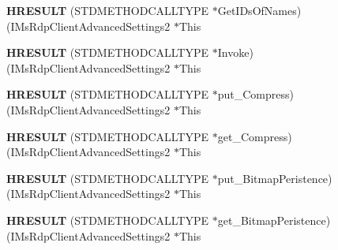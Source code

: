 \begin{DoxyCompactItemize}
\item 
\mbox{\label{struct_i_ms_rdp_client_advanced_settings2_vtbl_a07695658fcaeb0ec746813787e006a06}} 
{\bfseries H\+R\+E\+S\+U\+LT} (S\+T\+D\+M\+E\+T\+H\+O\+D\+C\+A\+L\+L\+T\+Y\+PE $\ast$Get\+I\+Ds\+Of\+Names)(I\+Ms\+Rdp\+Client\+Advanced\+Settings2 $\ast$This
\item 
\mbox{\label{struct_i_ms_rdp_client_advanced_settings2_vtbl_a28e6e8a8f912e6b46de41c37d44b7241}} 
{\bfseries H\+R\+E\+S\+U\+LT} (S\+T\+D\+M\+E\+T\+H\+O\+D\+C\+A\+L\+L\+T\+Y\+PE $\ast$Invoke)(I\+Ms\+Rdp\+Client\+Advanced\+Settings2 $\ast$This
\item 
\mbox{\label{struct_i_ms_rdp_client_advanced_settings2_vtbl_a63859ea0bf25d69e9b0d61fb230e764a}} 
{\bfseries H\+R\+E\+S\+U\+LT} (S\+T\+D\+M\+E\+T\+H\+O\+D\+C\+A\+L\+L\+T\+Y\+PE $\ast$put\+\_\+\+Compress)(I\+Ms\+Rdp\+Client\+Advanced\+Settings2 $\ast$This
\item 
\mbox{\label{struct_i_ms_rdp_client_advanced_settings2_vtbl_afabbe992ba1fda30c591bfeeb9b3c536}} 
{\bfseries H\+R\+E\+S\+U\+LT} (S\+T\+D\+M\+E\+T\+H\+O\+D\+C\+A\+L\+L\+T\+Y\+PE $\ast$get\+\_\+\+Compress)(I\+Ms\+Rdp\+Client\+Advanced\+Settings2 $\ast$This
\item 
\mbox{\label{struct_i_ms_rdp_client_advanced_settings2_vtbl_a0dd13ca6e4e0745dfd6e156f5aff7479}} 
{\bfseries H\+R\+E\+S\+U\+LT} (S\+T\+D\+M\+E\+T\+H\+O\+D\+C\+A\+L\+L\+T\+Y\+PE $\ast$put\+\_\+\+Bitmap\+Peristence)(I\+Ms\+Rdp\+Client\+Advanced\+Settings2 $\ast$This
\item 
\mbox{\label{struct_i_ms_rdp_client_advanced_settings2_vtbl_a109baff0dafb15ec52847f544dd05b59}} 
{\bfseries H\+R\+E\+S\+U\+LT} (S\+T\+D\+M\+E\+T\+H\+O\+D\+C\+A\+L\+L\+T\+Y\+PE $\ast$get\+\_\+\+Bitmap\+Peristence)(I\+Ms\+Rdp\+Client\+Advanced\+Settings2 $\ast$This
\item 
\mbox{\label{struct_i_ms_rdp_client_advanced_settings2_vtbl_a652f4514d84a18399a1a05c4faff99a5}} 

\end{DoxyCompactItemize}
